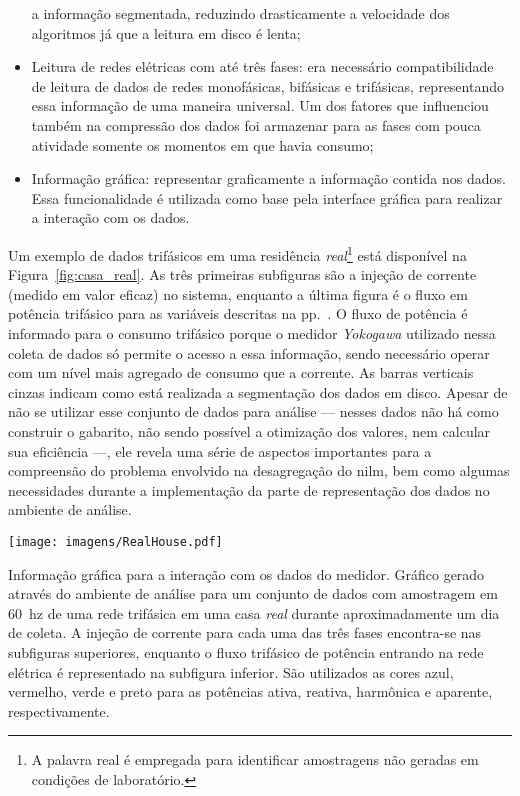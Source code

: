 \begin{itemize}
a informação segmentada, reduzindo drasticamente a velocidade dos
algoritmos já que a leitura em disco é lenta;
\item Leitura de redes elétricas com até três fases: era necessário
compatibilidade de leitura de dados de redes monofásicas, bifásicas e
trifásicas, representando essa informação de uma maneira universal. Um
dos fatores que influenciou também na compressão dos dados foi armazenar
para as fases com pouca atividade somente os momentos em que havia
consumo;
\item Informação gráfica: representar graficamente a informação contida
nos dados. Essa funcionalidade é utilizada como base pela interface
gráfica para realizar a interação com os dados.
\end{itemize}

Um exemplo de dados trifásicos em uma residência
\emph{real}\footnote{A palavra real é empregada para identificar
amostragens não geradas em condições de laboratório.} está
disponível na Figura~\ref{fig:casa_real}. As três primeiras subfiguras
são a injeção de corrente (medido em valor eficaz) no sistema,
enquanto a última figura é o fluxo em potência trifásico para as
variáveis descritas na pp.~\pageref{eq:ipqds}. O fluxo de potência é
informado para o consumo trifásico porque o medidor \emph{Yokogawa}
utilizado nessa coleta de dados só permite o acesso a essa informação,
sendo necessário operar com um nível mais agregado de consumo que a
corrente. As barras verticais cinzas indicam como está realizada a
segmentação dos dados em disco. Apesar de não se utilizar esse
conjunto de dados para análise --- nesses dados não há como construir
o gabarito, não sendo possível a otimização dos valores, nem calcular
sua eficiência ---, ele revela uma série de aspectos importantes para
a compreensão do problema envolvido na desagregação do \gls{nilm}, bem
como algumas necessidades durante a implementação da parte de
representação dos dados no ambiente de análise.

\begin{SidewaysFigure}
\centering
\texttt{[image: imagens/RealHouse.pdf]}
\caption[Informação gráfica para o interação com dados do medidor]
{Informação gráfica para a interação com os dados do medidor. Gráfico
gerado através do ambiente de análise para um conjunto de dados com
amostragem em 60~\acs{hz} de uma rede trifásica em uma casa
\emph{real} durante aproximadamente um dia de coleta. A injeção de
corrente para cada uma das três fases encontra-se nas subfiguras
superiores, enquanto o fluxo trifásico de potência entrando na rede
elétrica é representado na subfigura inferior. São utilizados as cores
azul, vermelho, verde e preto para as potências ativa, reativa,
harmônica e aparente, respectivamente.}
\label{fig:casa_real}
\end{SidewaysFigure}

